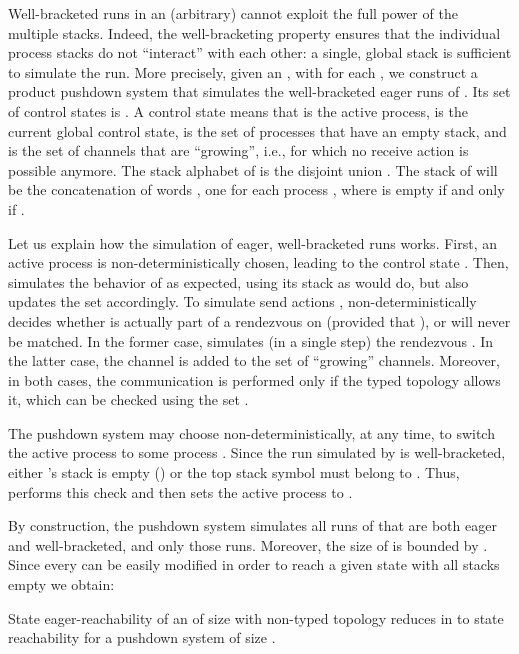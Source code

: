 \documentclass{LMCS}
\newenvironment{proposition}{\begin{prop}}{\end{prop}}
\begin{document}
Well-bracketed runs in an (arbitrary) \rqcp cannot exploit the full
power of the multiple stacks.  Indeed, the well-bracketing property
ensures that the individual process stacks do not ``interact'' with
each other: a single, global stack is sufficient to simulate the run.
More precisely, given an \rqcp , with
 for each , we
construct a product pushdown system  that simulates the
well-bracketed eager runs of .  Its set of control states is
.  A control state  means
that  is the active process,  is the current global
control state,  is the set of processes that have an empty 
stack, and  is the set of channels that are ``growing'', i.e., for
which no receive action is possible anymore.  The stack alphabet of
 is the disjoint union . The
stack of  will be the concatenation of 
words , one for each process , where  is empty if
and only if .

Let us explain how the simulation of eager, well-bracketed runs works.
First, an active process  is non-deterministically chosen, leading
to the control state .
Then,  simulates the behavior of  as expected, using
its stack as  would do, but also updates the set  accordingly. 
To simulate send actions ,  non-deterministically
decides whether  is actually part of a rendezvous  on 
(provided that ), or will never be matched. 
In the former case,  simulates (in a single step) the
rendezvous .
In the latter case, the channel  is added to the set  of
``growing'' channels. 
Moreover, in both cases, the communication is performed only if the
typed topology allows it, which can be checked using the set . 

The pushdown system  may choose
non-deterministically, at any
time, to switch the active process to
some process .  
Since the run simulated by  is well-bracketed, either
's stack is empty () or 
the top stack symbol must belong to . Thus,  
performs this check and then sets  the active process to .


By construction, the pushdown system  simulates all runs
of  that are both eager and well-bracketed, and only those
runs. Moreover, the size of  is bounded by
. Since every \rqcp can be easily
modified in order to reach a given state with all stacks empty we
obtain:

\begin{proposition}\label{prop:confl-reduction}
  State eager-reachability of an \rqcp of size  with
  non-\converging typed topology  
  reduces in \dexptime to state reachability for a pushdown system of
  size .
\end{proposition}
\end{document}
